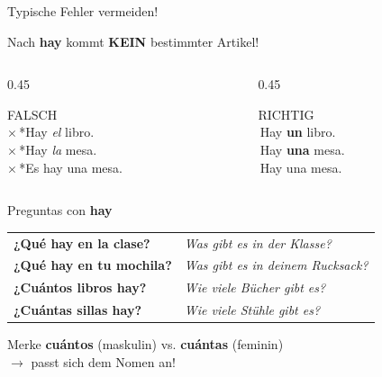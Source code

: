 \documentclass[aspectratio=169, 11pt]{beamer}
\newcommand{\es}[1]{\textbf{\textcolor{spanischrot}{#1}}}
\newcommand{\de}[1]{{\small\textcolor{dunkelgrau}{\textit{#1}}}}
\newcommand{\richtig}[1]{\textcolor{erfolg}{\checkmark\,#1}}
\newcommand{\falsch}[1]{\textcolor{fehler}{$\times$\,#1}}
\begin{document}
\begin{frame}{Typische Fehler vermeiden!}

\begin{center}
{\Large Nach \es{hay} kommt \textbf{KEIN} bestimmter Artikel!}
\end{center}

\vspace{1cm}

\begin{columns}[c]
\begin{column}{0.45\textwidth}
\begin{center}
{\Large\textcolor{fehler}{FALSCH}}\\[0.5em]
\falsch{*Hay \textit{el} libro.}\\[0.3em]
\falsch{*Hay \textit{la} mesa.}\\[0.3em]
\falsch{*Es hay una mesa.}
\end{center}
\end{column}

\begin{column}{0.45\textwidth}
\begin{center}
{\Large\textcolor{erfolg}{RICHTIG}}\\[0.5em]
\richtig{Hay \textbf{un} libro.}\\[0.3em]
\richtig{Hay \textbf{una} mesa.}\\[0.3em]
\richtig{Hay una mesa.}
\end{center}
\end{column}
\end{columns}

\end{frame}

\begin{frame}{Preguntas con \es{hay}}

\begin{tabular}{@{}ll@{}}
\es{¿Qué hay en la clase?} & \de{Was gibt es in der Klasse?} \\[0.8em]
\es{¿Qué hay en tu mochila?} & \de{Was gibt es in deinem Rucksack?} \\[0.8em]
\es{¿Cuántos libros hay?} & \de{Wie viele Bücher gibt es?} \\[0.8em]
\es{¿Cuántas sillas hay?} & \de{Wie viele Stühle gibt es?} \\
\end{tabular}

\vspace{1cm}

\begin{block}{Merke}
\es{cuánt\textbf{o}s} (maskulin) vs. \es{cuánt\textbf{a}s} (feminin)\\[0.3em]
$\rightarrow$ passt sich dem Nomen an!
\end{block}

\end{frame}
\end{document}
